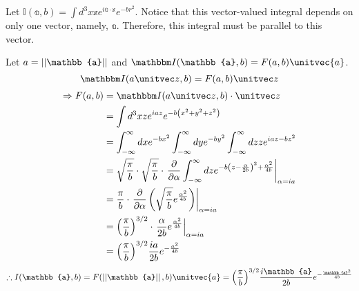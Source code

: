 \item

Let $\mathbb{I}(\mathbb{a}, b) = \int d^3x \mathbb{x} e^{i\mathbb{a} \cdot \mathbb{x}} e^{-br^2}$.
Notice that this vector-valued integral depends on only one vector, namely, $\mathbb{a}$.
Therefore, this integral must be parallel to this vector.

Let $a = \norm{\mathbb{a}}$ and $\mathbb{I}(\mathbb{a}, b) = F(a, b) \unitvec{a}$.
\[
	\mathbb{I}(a \zhat, b)
	= F(a, b) \zhat
\]
\begin{align*}
	\Rightarrow F(a, b)
	 & = \mathbb{I}(a \zhat, b) \cdot \zhat                                     \\
	 & = \int d^3 x z e^{iaz} e^{-b \left( x^2 + y^2 + z^2 \right)}             \\
	 & = \int_{-\infty}^{\infty} dx e^{-bx^2}
	\int_{-\infty}^{\infty} dy e^{-by^2}
	\int_{-\infty}^{\infty} dz z e^{iaz - bz^2}                                 \\
	 & = \sqrt{\frac{\pi}{b}} \cdot \sqrt{\frac{\pi}{b}} \cdot
	\evalAt{
	\partialderiv{\alpha} \int_{-\infty}^{\infty} dz e^{-b{\left( z - \frac{\alpha}{2b} \right)}^2 + \frac{\alpha^2}{4b}}
	}{\alpha = ia}                                                              \\
	 & = \frac{\pi}{b} \cdot \evalAt{
		\partialderiv{\alpha} \left(
		\sqrt{\frac{\pi}{b}} e^{\frac{\alpha^2}{4b}}
		\right)
	}{\alpha = ia}                                                              \\
	 & = {\left( \frac{\pi}{b} \right)}^{3/2} \cdot \evalAt{
		\frac{\alpha}{2b} e^{\frac{\alpha^2}{4b}}
	}{\alpha = ia}                                                              \\
	 & = {\left( \frac{\pi}{b} \right)}^{3/2} \frac{ia}{2b} e^{-\frac{a^2}{4b}}
\end{align*}
\[
	\therefore I(\mathbb{a}, b)
	= F(\norm{\mathbb{a}}, b) \unitvec{a}
	= {\left( \frac{\pi}{b} \right)}^{3/2} \frac{i\mathbb{a}}{2b} e^{-\frac{\mathbb{a}^2}{4b}}
\]